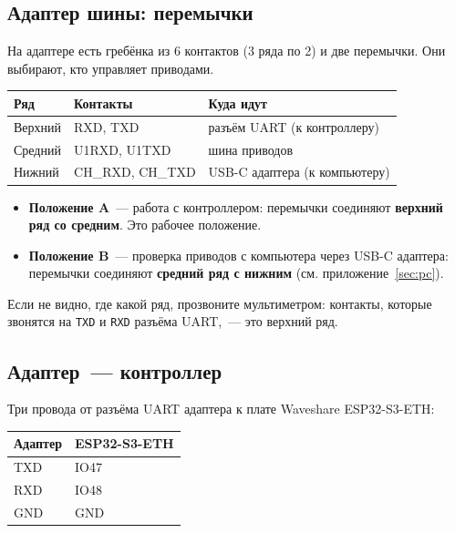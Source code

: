 \documentclass[a4paper,11pt]{article}
\begin{document}
\subsection{Адаптер шины: перемычки}

На адаптере есть гребёнка из 6 контактов (3 ряда по 2) и две перемычки.
Они выбирают, кто управляет приводами.

\begin{center}
\begin{tabular}{@{}lll@{}}
\toprule
\textbf{Ряд} & \textbf{Контакты} & \textbf{Куда идут} \\
\midrule
Верхний  & RXD, TXD       & разъём UART (к контроллеру) \\
Средний  & U1RXD, U1TXD   & шина приводов \\
Нижний   & CH\_RXD, CH\_TXD & USB-C адаптера (к компьютеру) \\
\bottomrule
\end{tabular}
\end{center}

\begin{itemize}
  \item \textbf{Положение A}~— работа с контроллером: перемычки соединяют \textbf{верхний ряд со средним}.
        Это рабочее положение.
  \item \textbf{Положение B}~— проверка приводов с компьютера через USB-C адаптера: перемычки соединяют
        \textbf{средний ряд с нижним} (см. приложение~\ref{sec:pc}).
\end{itemize}

\begin{hint}
Если не видно, где какой ряд, прозвоните мультиметром: контакты, которые звонятся
на \texttt{TXD} и \texttt{RXD} разъёма UART,~— это верхний ряд.
\end{hint}

\subsection{Адаптер~— контроллер}

Три провода от разъёма UART адаптера к плате Waveshare ESP32-S3-ETH:

\begin{center}
\begin{tabular}{@{}ll@{}}
\toprule
\textbf{Адаптер} & \textbf{ESP32-S3-ETH} \\
\midrule
TXD & IO47 \\
RXD & IO48 \\
GND & GND \\
\bottomrule
\end{tabular}
\end{center}
\end{document}
